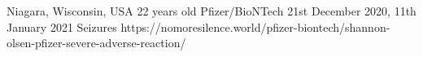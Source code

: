           {Niagara, Wisconsin, USA}
          {22 years old}
          {Pfizer/BioNTech}
          {21st December 2020, 11th January 2021}
          {Seizures}
          {https://nomoresilence.world/pfizer-biontech/shannon-olsen-pfizer-severe-adverse-reaction/}


